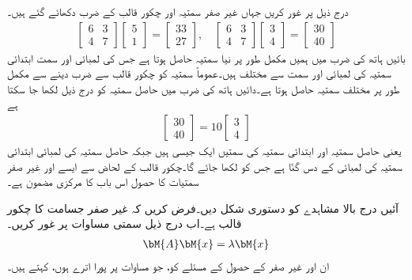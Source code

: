 درج ذیل پر غور کریں جہاں غیر صفر سمتیہ اور چکور قالب کے ضرب دکھائے گئے ہیں۔
\begin{align}\label{مساوات_امتیازی_پہلی_مثال}
\begin{bmatrix}6&3\\4&7  \end{bmatrix}\begin{bmatrix} 5\\1 \end{bmatrix}=\begin{bmatrix}33\\27  \end{bmatrix},\quad \begin{bmatrix}6&3\\4&7  \end{bmatrix}\begin{bmatrix} 3\\4 \end{bmatrix}=\begin{bmatrix}30\\40  \end{bmatrix}
\end{align} 
بائیں ہاتھ کی ضرب میں ہمیں مکمل طور پر نیا سمتیہ حاصل ہوتا ہے جس کی لمبائی اور سمت ابتدائی سمتیہ کی لمبائی اور سمت  سے مختلف ہیں۔عموماً  سمتیہ کو چکور قالب سے ضرب دینے  سے مکمل طور پر مختلف سمتیہ حاصل ہوتا ہے۔دائیں ہاتھ کی ضرب میں حاصل سمتیہ کو درج ذیل لکھا جا سکتا ہے 
\begin{align*}
\begin{bmatrix}30\\40  \end{bmatrix}=10\begin{bmatrix}3\\4  \end{bmatrix}
\end{align*}
یعنی حاصل سمتیہ اور ابتدائی سمتیہ کی سمتیں ایک جیسی ہیں جبکہ حاصل سمتیہ کی لمبائی ابتدائی سمتیہ کی لمبائی کے دس گنّا ہے جس کو  لکھا جائے گا۔چکور قالب  کے لحاض سے  ایسے  اور غیر صفر سمتیات کا حصول اس باب کا مرکزی مضمون ہے۔  

آئیں درج بالا مشاہدے کو دستوری شکل دیں۔فرض کریں کہ  غیر صفر  جسامت کا چکور قالب ہے۔اب درج ذیل سمتی مساوات پر غور کریں۔
\begin{align}\label{مساوات_امتیازی_مسئلہ_ب}
\bM{A}\bM{x}=\lambda \bM{x}
\end{align}
ان  اور غیر صفر  کے حصول کے مسئلے کو، جو مساوات  پر پورا اترے ہوں،   کہتے ہیں۔

